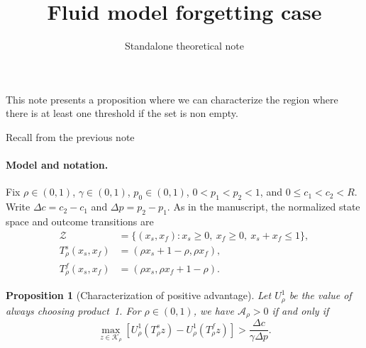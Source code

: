 \documentclass[11pt]{article}
\title{Fluid model forgetting case}
\author{Standalone theoretical note}
\date{}
\newtheorem{proposition}{Proposition}
\begin{document}
\maketitle

This note presents a proposition where we can characterize the region where there is at least one threshold if the set is non empty.

Recall from the previous note 

\paragraph{Model and notation.}
Fix $\rho\in(0,1)$, $\gamma\in(0,1)$, $p_0\in(0,1)$,
$0<p_1<p_2<1$, and $0\leq c_1<c_2<R$.
Write $\Delta c=c_2-c_1$ and $\Delta p=p_2-p_1$.
As in the manuscript, the normalized state space and outcome transitions are
\begin{align*}
\mathcal Z&=\{(x_s,x_f):x_s\geq0,\ x_f\geq0,\ x_s+x_f\leq1\},\\
T_\rho^s(x_s,x_f)&=(\rho x_s+1-\rho,\rho x_f),\\
T_\rho^f(x_s,x_f)&=(\rho x_s,\rho x_f+1-\rho).
\end{align*}


\begin{proposition}[Characterization of positive advantage]
\label{prop:positive-characterization}
Let $U^{1}_\rho$ be the value of always choosing product~1.
For $\rho\in(0,1)$, we have $\mathcal A_\rho>0$ if and only if
\begin{equation}
\max_{z\in\mathcal K_\rho}
\left[U_\rho^1(T_\rho^s z)-U_\rho^1(T_\rho^f z)\right]
>\frac{\Delta c}{\gamma\Delta p}.
\end{equation}
\end{proposition}
\end{document}
